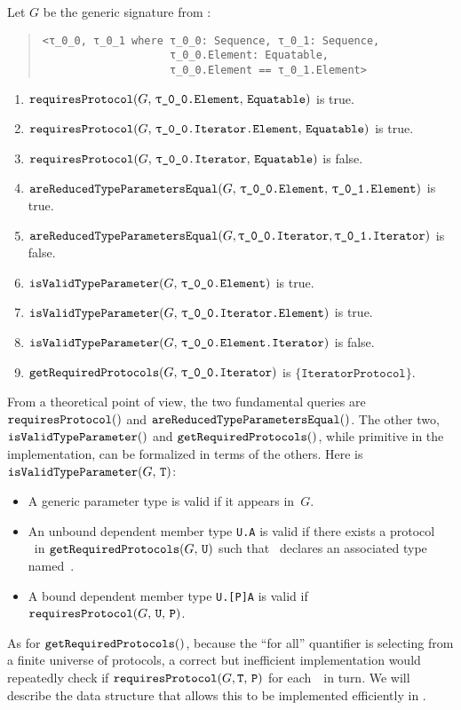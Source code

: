 \documentclass[../generics]{subfiles}
\begin{document}
\begin{example}
Let $G$ be the generic signature from :
\begin{quote}
\begin{verbatim}
<τ_0_0, τ_0_1 where τ_0_0: Sequence, τ_0_1: Sequence,
                    τ_0_0.Element: Equatable,
                    τ_0_0.Element == τ_0_1.Element>
\end{verbatim}
\end{quote}
\begin{enumerate}
\item $\Query{requiresProtocol}{G,\, \texttt{\rT.Element},\,\texttt{Equatable}}$ is true.
\item $\Query{requiresProtocol}{G,\, \texttt{\rT.Iterator.Element},\, \texttt{Equatable}}$ is true.
\item $\Query{requiresProtocol}{G,\, \texttt{\rT.Iterator},\, \texttt{Equatable}}$ is false.
\item $\Query{areReducedTypeParametersEqual}{G,\, \texttt{\rT.Element},\, \texttt{\rU.Element}}$ is true.
\item $\Query{areReducedTypeParametersEqual}{G, \texttt{\rT.Iterator}, \texttt{\rU.Iterator}}$ is false.
\item $\Query{isValidTypeParameter}{G,\, \texttt{\rT.Element}}$ is true.
\item $\Query{isValidTypeParameter}{G,\, \texttt{\rT.Iterator.Element}}$ is true.
\item $\Query{isValidTypeParameter}{G,\, \texttt{\rT.Element.Iterator}}$ is false.
\item $\Query{getRequiredProtocols}{G,\, \texttt{\rT.Iterator}}$ is $\{\texttt{IteratorProtocol}\}$.
\end{enumerate}
\end{example}

From a theoretical point of view, the two fundamental queries are $\texttt{requiresProtocol}()$ and $\texttt{areReducedTypeParametersEqual}()$. The other two, $\texttt{isValidTypeParameter}()$ and $\texttt{getRequiredProtocols}()$, while primitive in the implementation, can be formalized in terms of the others. Here is $\texttt{isValidTypeParameter}(G,\,\texttt{T})$:
\begin{itemize}
\item A generic parameter type is valid if it appears in~$G$.
\item An unbound dependent member type \texttt{U.A} is valid if there exists a protocol \tP\ in $\texttt{getRequiredProtocols}(G,\,\texttt{U})$
such that \tP\ declares an associated type named~\nA.
\item A bound dependent member type \texttt{U.[P]A} is valid if $\texttt{requiresProtocol}(G,\,\texttt{U},\,\texttt{P})$.
\end{itemize}
As for $\texttt{getRequiredProtocols}()$, because the ``for all'' quantifier is selecting from a finite universe of protocols, a correct but inefficient implementation would repeatedly check if $\texttt{requiresProtocol}(G,\texttt{T},\,\texttt{P})$ for each~\tP\ in turn. We will describe the data structure that allows this to be implemented efficiently in .
\end{document}
